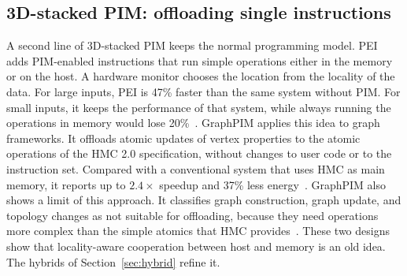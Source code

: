 \documentclass[journal,onecolumn]{IEEEtran}
\begin{document}
\subsection{3D-stacked PIM: offloading single instructions}
A second line of 3D-stacked PIM keeps the normal programming model. PEI adds PIM-enabled instructions that run simple operations either in the memory or on the host. A hardware monitor chooses the location from the locality of the data. For large inputs, PEI is 47\% faster than the same system without PIM. For small inputs, it keeps the performance of that system, while always running the operations in memory would lose 20\%~\cite{ahn2015pei}. GraphPIM applies this idea to graph frameworks. It offloads atomic updates of vertex properties to the atomic operations of the HMC 2.0 specification, without changes to user code or to the instruction set. Compared with a conventional system that uses HMC as main memory, it reports up to $2.4\times$ speedup and 37\% less energy~\cite{nai2017graphpim}. GraphPIM also shows a limit of this approach. It classifies graph construction, graph update, and topology changes as not suitable for offloading, because they need operations more complex than the simple atomics that HMC provides~\cite{nai2017graphpim}. These two designs show that locality-aware cooperation between host and memory is an old idea. The hybrids of Section~\ref{sec:hybrid} refine it.
\end{document}
